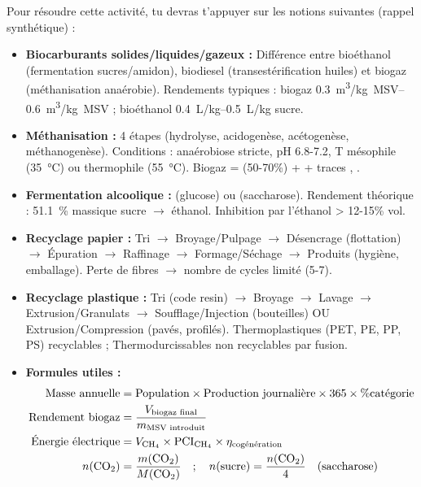 \documentclass[11pt]{article}
\newcounter{popsec}
\newcounter{popsub}
\newcommand{\courssub}[1]{%
  \stepcounter{popsub}%
  \par\vspace{9pt}\noindent{\popxbold\fontsize{11.5}{13}\selectfont\color{popink}{\color{poporange}\thepopsec.\thepopsub}\hspace{6pt}#1}\par\nopagebreak\vspace{4pt}
}
\begin{document}
\courssub{Ressources à mobiliser}
\par
Pour résoudre cette activité, tu devras t'appuyer sur les notions suivantes (rappel synthétique) :
\begin{itemize}
    \item \textbf{Biocarburants solides/liquides/gazeux :} Différence entre bioéthanol (fermentation sucres/amidon), biodiesel (transestérification huiles) et biogaz (méthanisation anaérobie). Rendements typiques : biogaz \SIrange{0,3}{0,6}{m^3/kg MSV} ; bioéthanol \SIrange{0,4}{0,5}{L/kg} sucre.
    \item \textbf{Méthanisation :} 4 étapes (hydrolyse, acidogenèse, acétogenèse, méthanogenèse). Conditions : anaérobiose stricte, pH \num{6,8}-\num{7,2}, T mésophile (\SI{35}{\celsius}) ou thermophile (\SI{55}{\celsius}). Biogaz =  (\num{50}-\num{70}\%) +  + traces , .
    \item \textbf{Fermentation alcoolique :}  (glucose) ou  (saccharose). Rendement théorique : \SI{51,1}{\%} massique sucre $\to$ éthanol. Inhibition par l'éthanol > \num{12}-\num{15}\% vol.
    \item \textbf{Recyclage papier :} Tri $\to$ Broyage/Pulpage $\to$ Désencrage (flottation) $\to$ Épuration $\to$ Raffinage $\to$ Formage/Séchage $\to$ Produits (hygiène, emballage). Perte de fibres $\to$ nombre de cycles limité (\num{5}-\num{7}).
    \item \textbf{Recyclage plastique :} Tri (code resin) $\to$ Broyage $\to$ Lavage $\to$ Extrusion/Granulats $\to$ Soufflage/Injection (bouteilles) OU Extrusion/Compression (pavés, profilés). Thermoplastiques (PET, PE, PP, PS) recyclables ; Thermodurcissables non recyclables par fusion.
    \item \textbf{Formules utiles :}
    \begin{align*}
        \text{Masse annuelle} &= \text{Population} \times \text{Production journalière} \times 365 \times \% \text{catégorie} \\
        \text{Rendement biogaz} &= \frac{V_{\text{biogaz final}}}{m_{\text{MSV introduit}}} \\
        \text{Énergie électrique} &= V_{\ce{CH4}} \times \text{PCI}_{\ce{CH4}} \times \eta_{\text{cogénération}} \\
        n(\ce{CO2}) &= \frac{m(\ce{CO2})}{M(\ce{CO2})} \quad ; \quad n(\text{sucre}) = \frac{n(\ce{CO2})}{4} \quad (\text{saccharose})
    \end{align*}
\end{itemize}
\end{document}
